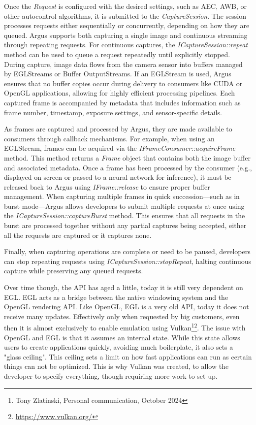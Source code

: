 Once the \textit{Request} is configured with the desired settings, such as
AEC, AWB, or other autocontrol algorithms, it is submitted to the
\textit{CaptureSession}. The session processes requests either sequentially or
concurrently, depending on how they are queued. Argus supports both capturing a
single image and continuous streaming through repeating requests. For continuous
captures, the \textit{ICaptureSession::repeat} method can be used to queue a request
repeatedly until explicitly stopped. During capture, image data flows from the
camera sensor into buffers managed by EGLStreams or Buffer OutputStreams. If an
EGLStream is used, Argus ensures that no buffer copies occur during delivery to
consumers like CUDA or OpenGL applications, allowing for highly efficient
processing pipelines. Each captured frame is accompanied by metadata that
includes information such as frame number, timestamp, exposure settings, and
sensor-specific details.

As frames are captured and processed by Argus, they are made available to
consumers through callback mechanisms. For example, when using an EGLStream,
frames can be acquired via the \textit{IFrameConsumer::acquireFrame} method.
This method returns a \textit{Frame} object that contains both the image buffer
and associated metadata. Once a frame has been processed by the consumer (e.g.,
displayed on screen or passed to a neural network for inference), it must be
released back to Argus using \textit{IFrame::release} to ensure proper buffer
management. When capturing multiple frames in quick succession—such as in burst
mode—Argus allows developers to submit multiple requests at once using the
\textit{ICaptureSession::captureBurst} method. This ensures that all requests
in the burst are processed together without any partial captures being
accepted, either all the requests are captured or it captures none.

Finally, when capturing operations are complete or need to be paused,
developers can stop repeating requests using \textit{ICaptureSession::stopRepeat}, halting
continuous capture while preserving any queued requests.

Over time though, the API has aged a little, today it is still very dependent
on EGL. EGL acts as a bridge between the native windowing system and the OpenGL rendering API.
Like OpenGL, EGL is a very old API, today it does not receive many
updates. Effectively only when requested by big customers, even then it is
almost exclusively to enable emulation using Vulkan\footnote{Tony Zlatinski,
Personal communication, October 2024}\footnote{\url{https://www.vulkan.org/}}.
The issue with OpenGL and EGL is that it assumes an internal state. While this
state allows users to create applications quickly, avoiding much boilerplate,
it also sets a "glass ceiling". This ceiling sets a limit on how fast
applications can run as certain things can not be optimized. This is why Vulkan
was created, to allow the developer to specify everything, though requiring
more work to set up.

